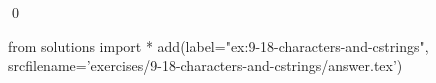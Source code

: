 
\begin{ex}
  \label{ex:9-18-characters-and-cstrings}
  
  \qed
\end{ex}
\begin{python0}
from solutions import *
add(label="ex:9-18-characters-and-cstrings",
    srcfilename='exercises/9-18-characters-and-cstrings/answer.tex')
\end{python0}
